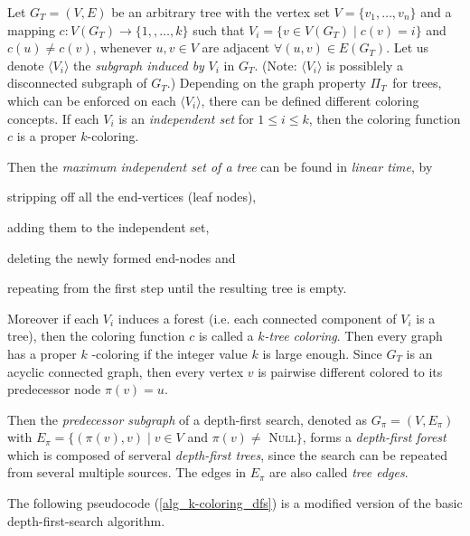 \documentclass[11pt]{article}
\begin{document}
Let $G_{T}=(V,E)$ be an arbitrary tree with the vertex set $V=\{v_{1},\ldots
,v_{n}\}$ and a mapping $c:V(G_{T})\rightarrow \{1,,\ldots ,k\}$ such that $%
V_{i}=\{v\in V(G_{T})\mid c(v)=i\}$ and $c(u)\neq c(v)$, whenever $u,v\in V$
are adjacent $\forall (u,v)\in E(G_{T})$. Let us denote $\langle
V_{i}\rangle $ the \textit{subgraph induced by }$V_{i}$ in $G_{T}.$ (Note: $%
\langle V_{i}\rangle $ is possiblely a disconnected subgraph of $G_{T}$.)
Depending on the graph property $\Pi _{T\text{ }}$for trees, which can be
enforced on each $\langle V_{i}\rangle $, there can be defined different
coloring concepts. If each $V_{i}$ is an \textit{independent set} for $1\leq
i\leq k$, then the coloring function $c$ is a proper $k$-coloring.

Then the \textit{maximum independent set of a tree} can be found in \textit{%
linear time}, by 
\begin{inparaenum}[\itshape 1\upshape)]
\item stripping off all the end-vertices (leaf nodes),
\item adding them to the independent set,
\item deleting the newly formed end-nodes and
\item repeating from the first step until the resulting tree is empty.
\end{inparaenum}Moreover if each $V_{i}$ induces a forest (i.e. each
connected component of $V_{i}$ is a tree), then the coloring function $c$ is
called a $k$\textit{-tree coloring}. Then every graph has a proper $k$%
-coloring if the integer value $k$ is large enough. Since $G_{T}$ is an
acyclic connected graph, then every vertex $v$ is pairwise different colored
to its predecessor node $\pi (v)=u$.

Then the \textit{predecessor subgraph} of a depth-first search, denoted as $%
G_{\pi }=(V,E_{\pi })$ with $E_{\pi }=\{(\pi (v),v)\mid v\in V$ and $\pi
(v)\neq $ \textsc{Null}$\}$, forms a \textit{depth-first forest} which is
composed of serveral \textit{depth-first trees}, since the search can be
repeated from several multiple sources. The edges in $E_{\pi }$ are also
called \textit{tree edges}.

The following pseudocode (\ref{alg_k-coloring_dfs}) is a modified version of
the basic depth-first-search algorithm.
\end{document}

